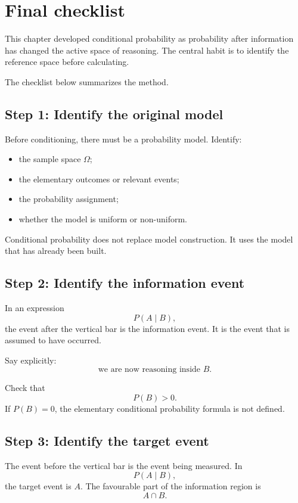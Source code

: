 \section{Final checklist}

This chapter developed conditional probability as probability after information
has changed the active space of reasoning. The central habit is to identify the
reference space before calculating.

The checklist below summarizes the method.

\subsection*{Step 1: Identify the original model}

Before conditioning, there must be a probability model. Identify:
\begin{itemize}
    \item the sample space \(\Omega\);
    \item the elementary outcomes or relevant events;
    \item the probability assignment;
    \item whether the model is uniform or non-uniform.
\end{itemize}

Conditional probability does not replace model construction. It uses the model
that has already been built.

\subsection*{Step 2: Identify the information event}

In an expression
\[
P(A\mid B),
\]
the event after the vertical bar is the information event. It is the event that
is assumed to have occurred.

Say explicitly:
\[
\text{we are now reasoning inside }B.
\]

Check that
\[
P(B)>0.
\]
If \(P(B)=0\), the elementary conditional probability formula is not defined.

\subsection*{Step 3: Identify the target event}

The event before the vertical bar is the event being measured. In
\[
P(A\mid B),
\]
the target event is \(A\). The favourable part of the information region is
\[
A\cap B.
\]

